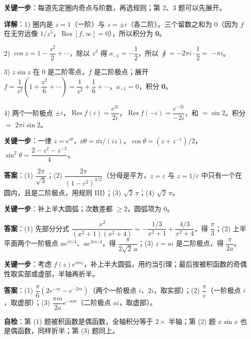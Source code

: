 \documentclass[11pt]{ctexart}
\renewcommand{\qbreak}{\needspace{0.45\textheight}}
\begin{document}
\textbf{关键一步}：每道先定圈内奇点与阶数，再选规则；第 2、3 题可以先展开。

\textbf{详解}：1) 圈内是 $z=1$（一阶）与 $z=\pm i$（各二阶）。三个留数之和为 0（因为 $f$ 在无穷远像 $1/z^{5}$，$\operatorname{Res}[f,\infty]=0$），所以积分为 \textbf{0}。

2) $\cos z=1-\dfrac{z^{2}}{2}+\cdots$，除以 $z^{3}$ 得 $a_{-1}=-\dfrac12$，所以 $\oint=-2\pi i\cdot\dfrac12=$ \textbf{$-\pi i$}。

3) $z\sin z$ 在 $0$ 是二阶零点，$f$ 是二阶极点；展开 $f=\dfrac{1}{z^{2}}\left(1+\dfrac{z^{2}}{6}+\cdots\right)=\dfrac{1}{z^{2}}+\dfrac16+\cdots$，$a_{-1}=0$，积分 \textbf{0}。

4) 两个一阶极点 $\pm i$，$\operatorname{Res}f(i)=\dfrac{e^{2i}}{2i}$，$\operatorname{Res}f(-i)=\dfrac{e^{-2i}}{-2i}$，和 $=\sin2$。积分 $=$ \textbf{$2\pi i\sin2$}。

\qbreak
{}

\textbf{关键一步}：一律 $z=e^{i\theta}$，$\dd\theta=\dd z/(iz)$，$\cos\theta=(z+z^{-1})/2$，$\sin^{2}\theta=\dfrac{2-z^{2}-z^{-2}}{4}$。

\textbf{答案}：(1) $\dfrac{2\pi}{\sqrt3}$；(2) $\dfrac{2\pi}{(1-\varepsilon^{2})^{3/2}}$（分母是平方，$z=\varepsilon$ 与 $z=1/\varepsilon$ 中只有一个在圆内，且是二阶极点，用规则 III）；(3) $\sqrt2\,\pi$；(4) $\sqrt2\,\pi$。

\qbreak
{}

\textbf{关键一步}：补上半大圆弧；次数差都 $\ge2$，圆弧项为 0。

\textbf{答案}：(1) 先部分分式 $\dfrac{x^{2}}{(x^{2}+1)(x^{2}+4)}=-\dfrac{1/3}{x^{2}+1}+\dfrac{4/3}{x^{2}+4}$，得 $\dfrac{\pi}{3}$；(2) 上半平面两个一阶极点 $ae^{i\pi/4}$、$ae^{3i\pi/4}$，得 $\dfrac{\pi}{2\sqrt2\,a}$；(3) $z=ai$ 是二阶极点，得 $\dfrac{\pi}{2a}$。

\qbreak
{}

\textbf{关键一步}：考虑 $f(z)e^{imz}$，补上半大圆弧，用约当引理；最后按被积函数的奇偶性取实部或虚部，半轴再折半。

\textbf{答案}：(1) $\dfrac{\pi}{6}\left(2e^{-m}-e^{-2m}\right)$（两个一阶极点 $i$、$2i$，取实部）；(2) $\dfrac{\pi}{e}$（一阶极点 $i$，取虚部）；(3) $\dfrac{\pi m}{2a}e^{-am}$（二阶极点 $ai$，取虚部）。

\textbf{自检}：第 (1) 题被积函数是偶函数，全轴积分等于 $2\times$ 半轴；第 (2) 题 $x\sin x$ 也是偶函数，同样折半；第 (3) 题同上。
\end{document}
